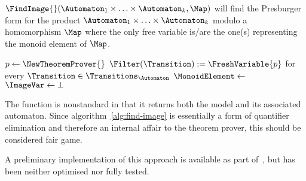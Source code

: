   \begin{algorithm}
    \DontPrintSemicolon
    \caption{$\FindImage{}(\Automaton_1 \times \ldots \times \Automaton_k, \Map)$ will find the Presburger form for the product $\Automaton_1 \times \ldots \times \Automaton_k$ modulo a homomorphism $\Map$ where the only free variable is/are the one(s) representing the monoid element of $\Map$.}\label{alg:find-image}
  
$p \gets \NewTheoremProver{}$\;
$\Filter(\Transition) := \FreshVariable{p}$ for every $\Transition \in \Transitions_{\Automaton}$\;
$\MonoidElement \gets$ \;
\;
$\ImageVar \gets \bot$\;
    \KwRet{\ImageVar}
    \end{algorithm}

    The \GetModel{} function is nonstandard in that it returns both the model
    and its associated automaton. Since algorithm~\ref{alg:find-image} is
    essentially a form of quantifier elimination and therefore an internal affair
    to the theorem prover, this should be considered fair game.
    
    A preliminary implementation of this approach is available as part
    of~\Catra, but has been neither optimised nor fully tested.


